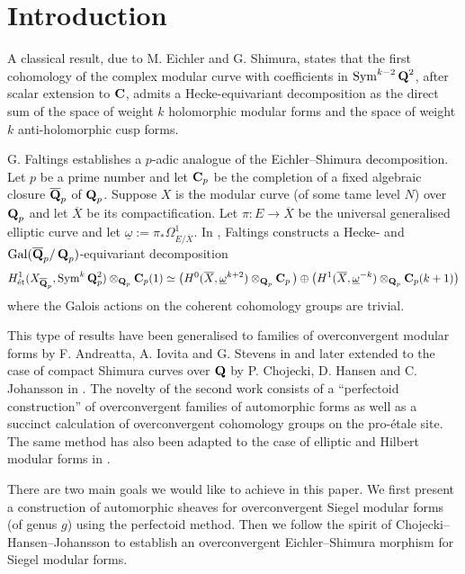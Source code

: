 \section{Introduction}
A classical result, due to M. Eichler and G. Shimura, states that the first cohomology of the complex modular curve with coefficients in $\mathrm{Sym}^{k-2}\operatorname{\mathbf{Q}}^2$, after scalar extension to $\operatorname{\mathbf{C}}$, admits a Hecke-equivariant decomposition as the direct sum of the space of weight $k$ holomorphic modular forms and the space of weight $k$ anti-holomorphic cusp forms.

G. Faltings establishes a $p$-adic analogue of the Eichler--Shimura decomposition. Let $p$ be a prime number and let $\operatorname{\mathbf{C}}_p$ be the completion of a fixed algebraic closure $\overline{\operatorname{\mathbf{Q}}}_p$ of $\operatorname{\mathbf{Q}}_p$. Suppose $X$ is the modular curve (of some tame level $N$) over $\operatorname{\mathbf{Q}}_p$ and let $\overline{X}$ be its compactification. Let $\pi: E\rightarrow \overline{X}$ be the universal generalised elliptic curve and let $\underline{\omega}:=\pi_*\Omega^1_{E/\overline{X}}$. In \cite{FaltingsHT}, Faltings constructs a Hecke- and $\mathrm{Gal}(\overline{\operatorname{\mathbf{Q}}}_p/\operatorname{\mathbf{Q}}_p)$-equivariant decomposition
\[
H_{\operatorname{\textrm{\'{e}t}}}^1(X_{\overline{\operatorname{\mathbf{Q}}}_p},\mathrm{Sym}^{k}\operatorname{\mathbf{Q}}_p^2)\otimes_{\operatorname{\mathbf{Q}}_p} \operatorname{\mathbf{C}}_p(1) \simeq \big(H^0(\overline{X},\underline{\omega}^{k+2})\otimes_{\operatorname{\mathbf{Q}}_p} \operatorname{\mathbf{C}}_p\big) \oplus \big(H^1(\overline{X},\underline{\omega}^{-k})\otimes_{\operatorname{\mathbf{Q}}_p} \operatorname{\mathbf{C}}_p (k+1)\big) 
\]
where the Galois actions on the coherent cohomology groups are trivial. 

This type of results have been generalised to families of overconvergent modular forms by F. Andreatta, A. Iovita and G. Stevens in \cite{AIS-2015} and later extended to the case of compact Shimura curves over $\operatorname{\mathbf{Q}}$ by P. Chojecki, D. Hansen and C. Johansson in \cite{CHJ-2017}. The novelty of the second work consists of a ``perfectoid construction'' of overconvergent families of automorphic forms as well as a succinct calculation of overconvergent cohomology groups on the pro-\'etale site. The same method has also been adapted to the case of elliptic and Hilbert modular forms in \cite{BHW-2019}.

There are two main goals we would like to achieve in this paper. We first present a construction of automorphic sheaves for overconvergent Siegel modular forms (of genus $g$) using the perfectoid method. Then we follow the spirit of Chojecki--Hansen--Johansson to establish an overconvergent Eichler--Shimura morphism for Siegel modular forms. 

